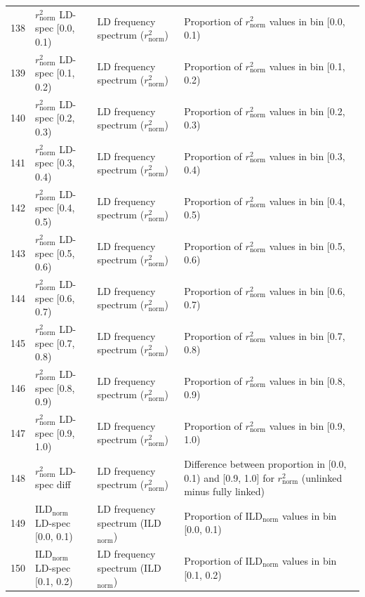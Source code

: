 \begin{longtable}{@{}rllp{7.5cm}@{}}
\midrule
138 & $r^2_\mathrm{norm}$ LD-spec [0.0, 0.1) & LD frequency spectrum ($r^2_\mathrm{norm}$) & Proportion of $r^2_\mathrm{norm}$ values in bin [0.0, 0.1) \\
139 & $r^2_\mathrm{norm}$ LD-spec [0.1, 0.2) & LD frequency spectrum ($r^2_\mathrm{norm}$) & Proportion of $r^2_\mathrm{norm}$ values in bin [0.1, 0.2) \\
140 & $r^2_\mathrm{norm}$ LD-spec [0.2, 0.3) & LD frequency spectrum ($r^2_\mathrm{norm}$) & Proportion of $r^2_\mathrm{norm}$ values in bin [0.2, 0.3) \\
141 & $r^2_\mathrm{norm}$ LD-spec [0.3, 0.4) & LD frequency spectrum ($r^2_\mathrm{norm}$) & Proportion of $r^2_\mathrm{norm}$ values in bin [0.3, 0.4) \\
142 & $r^2_\mathrm{norm}$ LD-spec [0.4, 0.5) & LD frequency spectrum ($r^2_\mathrm{norm}$) & Proportion of $r^2_\mathrm{norm}$ values in bin [0.4, 0.5) \\
143 & $r^2_\mathrm{norm}$ LD-spec [0.5, 0.6) & LD frequency spectrum ($r^2_\mathrm{norm}$) & Proportion of $r^2_\mathrm{norm}$ values in bin [0.5, 0.6) \\
144 & $r^2_\mathrm{norm}$ LD-spec [0.6, 0.7) & LD frequency spectrum ($r^2_\mathrm{norm}$) & Proportion of $r^2_\mathrm{norm}$ values in bin [0.6, 0.7) \\
145 & $r^2_\mathrm{norm}$ LD-spec [0.7, 0.8) & LD frequency spectrum ($r^2_\mathrm{norm}$) & Proportion of $r^2_\mathrm{norm}$ values in bin [0.7, 0.8) \\
146 & $r^2_\mathrm{norm}$ LD-spec [0.8, 0.9) & LD frequency spectrum ($r^2_\mathrm{norm}$) & Proportion of $r^2_\mathrm{norm}$ values in bin [0.8, 0.9) \\
147 & $r^2_\mathrm{norm}$ LD-spec [0.9, 1.0) & LD frequency spectrum ($r^2_\mathrm{norm}$) & Proportion of $r^2_\mathrm{norm}$ values in bin [0.9, 1.0) \\
148 & $r^2_\mathrm{norm}$ LD-spec diff & LD frequency spectrum ($r^2_\mathrm{norm}$) & Difference between proportion in [0.0, 0.1) and [0.9, 1.0] for $r^2_\mathrm{norm}$ (unlinked minus fully linked) \\
\midrule
149 & ILD$_\mathrm{norm}$ LD-spec [0.0, 0.1) & LD frequency spectrum (ILD$_\mathrm{norm}$) & Proportion of ILD$_\mathrm{norm}$ values in bin [0.0, 0.1) \\
150 & ILD$_\mathrm{norm}$ LD-spec [0.1, 0.2) & LD frequency spectrum (ILD$_\mathrm{norm}$) & Proportion of ILD$_\mathrm{norm}$ values in bin [0.1, 0.2) \\

\end{longtable}
